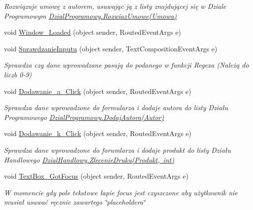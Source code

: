 \begin{DoxyCompactItemize}
\begin{DoxyCompactList}\small\item\em Rozwiązuje umowę z autorem, usuwając ją z listy znajdującej się w Dziale Programowym \mbox{\hyperlink{class_projekt1_1_1_dzial_programowy_a3852b732a1b07ffc107ac6dc90fb5d64}{Dzial\+Programowy.\+Rozwiaz\+Umowe(\+Umowa)}} \end{DoxyCompactList}\item 
void \mbox{\hyperlink{class_projekt1_1_1_main_window_a3948b116ee03c37310b5d5ae40d5e897}{Window\+\_\+\+Loaded}} (object sender, Routed\+Event\+Args e)
\item 
void \mbox{\hyperlink{class_projekt1_1_1_main_window_a8f44a16b7884a19d25f56bbc8d6879be}{Sprawdzanie\+Inputu}} (object sender, Text\+Composition\+Event\+Args e)
\begin{DoxyCompactList}\small\item\em Sprawdza czy dane wprowadzane pasują do podanego w funkcji Regexa (Należą do liczb 0-\/9) \end{DoxyCompactList}\item 
void \mbox{\hyperlink{class_projekt1_1_1_main_window_a7c47edbac430842dfc7cb637863160b6}{Dodawanie\+\_\+a\+\_\+\+Click}} (object sender, Routed\+Event\+Args e)
\begin{DoxyCompactList}\small\item\em Sprawdza dane wprowadzone do formularza i dodaje autora do listy Działu Programowego \mbox{\hyperlink{class_projekt1_1_1_dzial_programowy_ae3036a341f8a8ecc9c4069cc3604a8d3}{Dzial\+Programowy.\+Dodaj\+Autora(\+Autor)}} \end{DoxyCompactList}\item 
void \mbox{\hyperlink{class_projekt1_1_1_main_window_a6e02390940f88787309592a970516240}{Dodawanie\+\_\+k\+\_\+\+Click}} (object sender, Routed\+Event\+Args e)
\begin{DoxyCompactList}\small\item\em Sprawdza dane wprowadzone do forumlarza i dodaje produkt do listy Działu Handlowego \mbox{\hyperlink{class_projekt1_1_1_dzial_handlowy_a42c78f53cf41e75b39498a7da96e7bc3}{Dzial\+Handlowy.\+Zlecenie\+Druku(\+Produkt, int)}} \end{DoxyCompactList}\item 
void \mbox{\hyperlink{class_projekt1_1_1_main_window_a2c13e27e971d368d37047c6b41ba86c4}{Text\+Box\+\_\+\+Got\+Focus}} (object sender, Routed\+Event\+Args e)
\begin{DoxyCompactList}\small\item\em W momencie gdy pole tekstowe łapie focus jest czyszczone aby użytkownik nie musiał usuwać ręcznie zawartego \char`\"{}placeholder\textquotesingle{}a\char`\"{} \end{DoxyCompactList}\item 

\end{DoxyCompactItemize}
